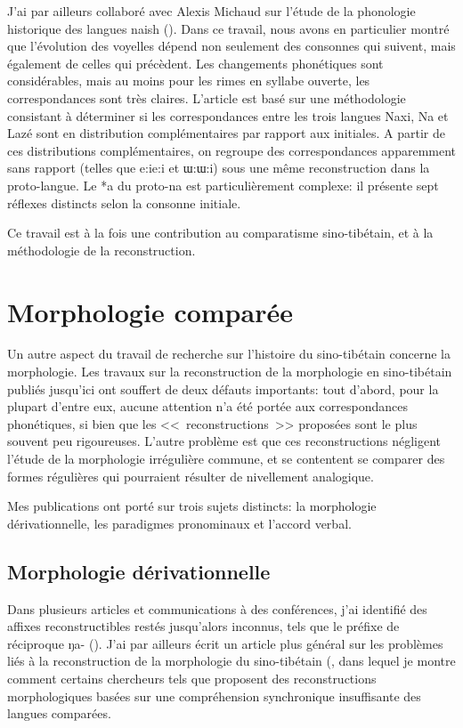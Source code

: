 \documentclass[oldfontcommands,oneside,a4paper,11pt]{memoir}
\begin{document}
J'ai par ailleurs collaboré avec Alexis Michaud sur l'étude de la phonologie historique des langues naish (\citealt{jacques.michaud11naish}). Dans ce travail, nous avons en particulier montré que l'évolution des voyelles dépend non seulement des consonnes qui suivent, mais également de celles qui précèdent. Les changements phonétiques sont considérables, mais au moins pour les rimes en syllabe ouverte, les correspondances sont très claires. L'article est basé sur une méthodologie consistant à déterminer si les correspondances entre les trois langues Naxi, Na et Lazé sont en distribution complémentaires par rapport aux initiales. A partir de ces distributions complémentaires, on regroupe des correspondances apparemment sans rapport (telles que e:ie:i et ɯ:ɯ:i) sous une même reconstruction dans la proto-langue. Le *a du proto-na est particulièrement complexe: il présente sept réflexes distincts selon la consonne initiale. 

Ce travail est à la fois une contribution au comparatisme sino-tibétain, et à la méthodologie de la reconstruction.

\section{Morphologie comparée}
	Un autre aspect du travail de recherche sur l’histoire du sino-tibétain concerne la morphologie. Les travaux sur la reconstruction de la morphologie en sino-tibétain publiés jusqu’ici ont souffert de deux défauts importants: tout d’abord, pour la plupart d’entre eux, aucune attention n’a été portée aux correspondances phonétiques, si bien que les <<~reconstructions~>> proposées sont le plus souvent peu rigoureuses. L’autre problème est que ces reconstructions négligent l’étude de la morphologie irrégulière commune, et se contentent se comparer des formes régulières qui pourraient résulter de nivellement analogique.
	
	Mes publications ont porté sur trois sujets distincts: la morphologie dérivationnelle, les paradigmes pronominaux et l'accord verbal. 
	\subsection{Morphologie dérivationnelle}
	Dans plusieurs articles et communications à des conférences, j’ai identifié des affixes reconstructibles restés jusqu’alors inconnus, tels que le préfixe de réciproque ŋa- (\citealt{jacques07passif}). J’ai par ailleurs écrit un article plus général sur les problèmes liés à la reconstruction de la morphologie du sino-tibétain (\citealt{jacques06morpho}, dans lequel je montre comment certains chercheurs tels que \citet{matisoff03} proposent des reconstructions morphologiques basées sur une compréhension synchronique insuffisante des langues comparées.
\end{document}
